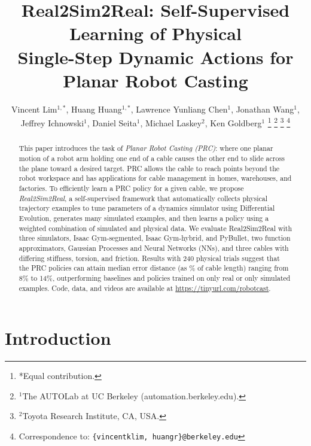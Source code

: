 \documentclass[letterpaper, 10pt, conference]{ieeeconf}  %
\title{\LARGE \bf
Real2Sim2Real: Self-Supervised Learning of Physical \\ Single-Step Dynamic Actions for Planar Robot Casting
}
\author{Vincent Lim$^{1,*}$, Huang Huang$^{1,*}$, Lawrence Yunliang Chen$^{1}$, Jonathan Wang$^{1}$, \\  Jeffrey Ichnowski$^{1}$, Daniel Seita$^{1}$, Michael Laskey$^2$, Ken Goldberg$^1$%
\thanks{*Equal contribution.}%
\thanks{$^{1}$The AUTOLab at UC Berkeley (automation.berkeley.edu).}%
\thanks{$^{2}$Toyota Research Institute, CA, USA.}
\thanks{Correspondence to: {\tt\scriptsize \{vincentklim, huangr\}@berkeley.edu}}
}
\begin{document}
\maketitle
\thispagestyle{empty}
\pagestyle{empty}


\begin{abstract}
This paper introduces the task of {\em Planar Robot Casting (PRC)}: where one planar motion of a robot arm holding one end of a cable causes the other end to slide across the plane toward a desired target. PRC allows the cable to reach points beyond the robot workspace and has applications for cable management in homes, warehouses, and factories. To efficiently learn a PRC policy for a given cable, we propose {\em Real2Sim2Real}, a self-supervised framework that automatically collects physical trajectory examples to tune parameters of a dynamics simulator using Differential Evolution, generates many simulated examples, and then learns a policy using a weighted combination of simulated and physical data. We evaluate Real2Sim2Real with three simulators, Isaac Gym-segmented, Isaac Gym-hybrid, and PyBullet, two function approximators, Gaussian Processes and Neural Networks (NNs), and three cables with differing stiffness, torsion, and friction. Results with 240 physical trials suggest that the PRC policies can attain median error distance (as \% of cable length) ranging from 8\% to 14\%, outperforming baselines and policies trained on only real or only simulated examples.
Code, data, and videos are available at \url{https://tinyurl.com/robotcast}.
\end{abstract}


\section{Introduction}\label{sec:intro}
\end{document}
